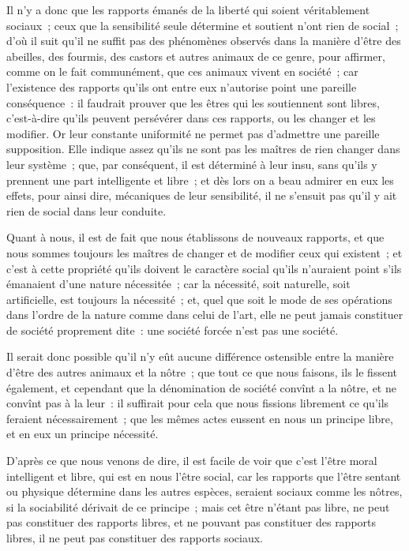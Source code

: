 \documentclass[french,twoside]{book} %
\begin{document}
Il n’y a donc que les rapports émanés de la liberté qui soient véritablement sociaux ; ceux que la sensibilité seule détermine et soutient n’ont rien de social ; d’où il suit qu’il ne suffit pas des phénomènes observés dans la manière d’être des abeilles, des fourmis, des castors et autres animaux de ce genre, pour affirmer, comme on le fait communément, que ces animaux vivent en société ; car l’existence des rapports qu’ils ont entre eux n’autorise point une pareille conséquence : il faudrait prouver que les êtres qui les soutiennent sont libres, c’est-à-dire qu’ils peuvent persévérer dans ces rapports, ou les changer et les modifier. Or leur constante uniformité ne permet pas d’admettre une pareille supposition. Elle indique assez qu’ils ne sont pas les maîtres de rien changer dans leur système ; que, par conséquent, il est déterminé à leur insu, sans qu’ils y prennent une part intelligente et libre ; et dès lors on a beau admirer en eux les effets, pour ainsi dire, mécaniques de leur sensibilité, il ne s’ensuit pas qu’il y ait rien de social dans leur conduite.\par
Quant à nous, il est de fait que nous établissons de nouveaux rapports, et que nous sommes toujours les maîtres de changer et de modifier ceux qui existent ; et c’est à cette propriété qu’ils doivent le caractère social qu’ils n’auraient point s’ils émanaient d’une nature nécessitée ; car la nécessité, soit naturelle, soit artificielle, est toujours la nécessité ; et, quel que soit le mode de ses opérations dans l’ordre de la nature comme dans celui de l’art, elle ne peut jamais constituer de société proprement dite : une société forcée n’est pas une société.\par
Il serait donc possible qu’il n’y eût aucune différence ostensible entre la manière d’être des autres animaux et la nôtre ; que tout ce que nous faisons, ils le fissent également, et cependant que la dénomination de société convînt a la nôtre, et ne convînt pas à la leur : il suffirait pour cela que nous fissions librement ce qu’ils feraient nécessairement ; que les mêmes actes eussent en nous un principe libre, et en eux un principe nécessité.\par
D’après ce que nous venons de dire, il est facile de voir que c’est l’être moral intelligent et libre, qui est en nous l’être social, car les rapports que l’être sentant ou physique détermine dans les autres espèces, seraient sociaux comme les nôtres, si la sociabilité dérivait de ce principe ; mais cet être n’étant pas libre, ne peut pas constituer des rapports libres, et ne pouvant pas constituer des rapports libres, il ne peut pas constituer des rapports sociaux.\par
\end{document}
